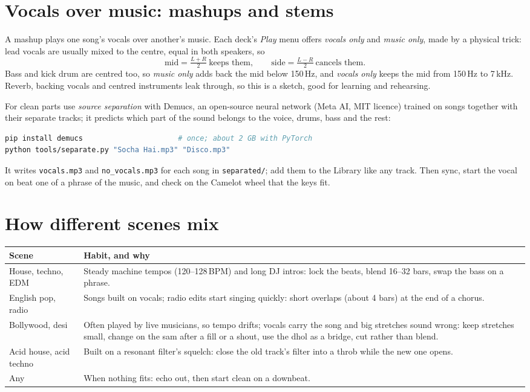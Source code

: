 \section{Vocals over music: mashups and stems}
A mashup plays one song's vocals over another's music. Each deck's \emph{Play} menu offers \emph{vocals only} and \emph{music only}, made by a physical trick: lead vocals are usually mixed to the centre, equal in both speakers, so
\[ \text{mid} = \tfrac{L+R}{2} \ \text{keeps them}, \qquad \text{side} = \tfrac{L-R}{2} \ \text{cancels them}. \]
Bass and kick drum are centred too, so \emph{music only} adds back the mid below 150\,Hz, and \emph{vocals only} keeps the mid from 150\,Hz to 7\,kHz. Reverb, backing vocals and centred instruments leak through, so this is a sketch, good for learning and rehearsing.

For clean parts use \emph{source separation} with Demucs, an open-source neural network (Meta AI, MIT licence) trained on songs together with their separate tracks; it predicts which part of the sound belongs to the voice, drums, bass and the rest:
\begin{lstlisting}[language=bash]
pip install demucs                      # once; about 2 GB with PyTorch
python tools/separate.py "Socha Hai.mp3" "Disco.mp3"
\end{lstlisting}
It writes \texttt{vocals.mp3} and \texttt{no\_vocals.mp3} for each song in \texttt{separated/}; add them to the Library like any track. Then sync, start the vocal on beat one of a phrase of the music, and check on the Camelot wheel that the keys fit.

\section{How different scenes mix}
\begin{tabularx}{\linewidth}{@{}lX@{}}
\toprule
Scene & Habit, and why \\
\midrule
House, techno, EDM & Steady machine tempos (120--128\,BPM) and long DJ intros: lock the beats, blend 16--32 bars, swap the bass on a phrase. \\
English pop, radio & Songs built on vocals; radio edits start singing quickly: short overlaps (about 4 bars) at the end of a chorus. \\
Bollywood, desi & Often played by live musicians, so tempo drifts; vocals carry the song and big stretches sound wrong: keep stretches small, change on the sam after a fill or a shout, use the dhol as a bridge, cut rather than blend. \\
Acid house, acid techno & Built on a resonant filter's squelch: close the old track's filter into a throb while the new one opens. \\
Any & When nothing fits: echo out, then start clean on a downbeat. \\
\bottomrule
\end{tabularx}

